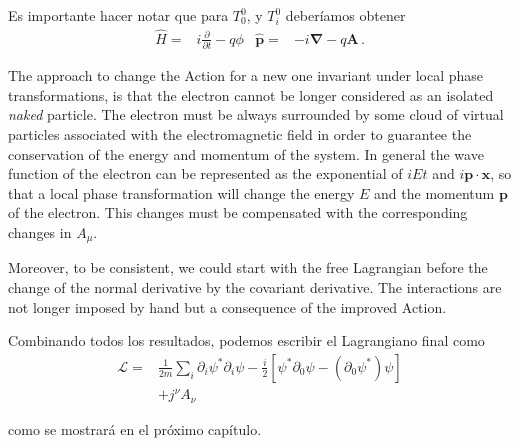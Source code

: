 Es importante hacer notar que para  $T^0_0$, y $T^0_i$ deberíamos obtener
\begin{align}
  \widehat{H}=& i\frac{\partial}{\partial t}-q\phi & \widehat{\mathbf{p}}=&-i\boldsymbol{\nabla}-q\mathbf{A}\,.
\end{align}



The approach to change the Action for a new one invariant under local phase  transformations, is that the electron cannot be longer considered as an isolated \emph{naked} particle. The electron must be always surrounded by some cloud of virtual particles associated with the electromagnetic field in order to guarantee the conservation of the energy and momentum of the system. In general the wave function of the electron can be represented as the exponential of $iEt$ and $i \mathbf{p}\cdot \mathbf{x}$, so that a local phase transformation will change the energy $E$ and the momentum $\mathbf{p}$ of the electron. This changes must be compensated with the corresponding changes in $A_{\mu}$.

Moreover, to be consistent, we could start with the free Lagrangian before the change of the normal derivative by the covariant derivative. The interactions are not longer imposed by hand but a consequence of the improved Action. 

Combinando todos los resultados, podemos escribir el Lagrangiano final como %
\begin{align}
  \mathcal{L}=&\frac{1}{2m}\sum_i\partial_i\psi^*\partial_i\psi
-\frac{i}{2}
  \left[\psi^*\partial_0\psi-(\partial_0\psi^*)\psi\right] \nonumber\\
&+j^\nu A_\nu%
\end{align}

como se mostrará en el próximo capítulo.

